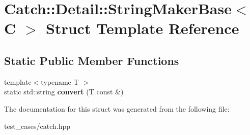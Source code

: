 \hypertarget{structCatch_1_1Detail_1_1StringMakerBase}{}\section{Catch\+:\+:Detail\+:\+:String\+Maker\+Base$<$ C $>$ Struct Template Reference}
\label{structCatch_1_1Detail_1_1StringMakerBase}
\subsection*{Static Public Member Functions}
\begin{DoxyCompactItemize}
\item 
\mbox{\label{structCatch_1_1Detail_1_1StringMakerBase_a8eb9f635dc413a5758e22614bafaf1a3}} 
{\footnotesize template$<$typename T $>$ }\\static std\+::string {\bfseries convert} (T const \&)
\end{DoxyCompactItemize}


The documentation for this struct was generated from the following file\+:\begin{DoxyCompactItemize}
\item 
test\+\_\+cases/catch.\+hpp\end{DoxyCompactItemize}
